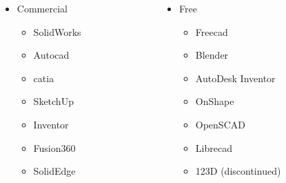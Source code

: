 \begin{frame}
    \begin{columns}
        \hspace{0.1\textwidth}
        \begin{column}[t]{0.4\textwidth}
            \begin{itemize}
                \item Commercial
                      \begin{itemize}
                          \item SolidWorks
                          \item Auto\acs{cad}
                          \item \acs{catia}
                          \item SketchUp
                          \item Inventor
                          \item Fusion360
                          \item SolidEdge
                      \end{itemize}
            \end{itemize}
        \end{column}
        \begin{column}[t]{0.4\textwidth}
            \begin{itemize}
                \item Free
                      \begin{itemize}
                          \item Free\acs{cad}
                          \item Blender
                          \item \textcolor{tw-gray}{AutoDesk Inventor}
                          \item \textcolor{tw-gray}{OnShape}
                          \item OpenSCAD
                          \item Libre\acs{cad}
                          \item 123D (discontinued)
                      \end{itemize}
            \end{itemize}
        \end{column}
        \hspace{0.1\textwidth}
    \end{columns}
\end{frame}